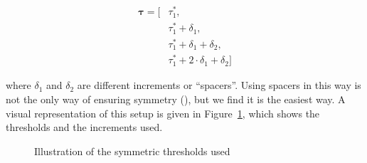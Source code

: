 \documentclass[
]{article}
\begin{document}
\[
\begin{aligned}
\symbf{\tau} = [ & \tau^*_1,  \\
& \tau^*_1 + \delta_1, \\
& \tau^*_1 + \delta_1 + \delta_2, \\
& \tau^*_1 + 2 \cdot \delta_1 + \delta_2 
]
\end{aligned}
\]

where \(\delta_1\) and \(\delta_2\) are different increments or
``spacers''. Using spacers in this way is not the only way of ensuring
symmetry (), but we
find it is the easiest way. A visual representation of this setup is
given in Figure~\ref{fig-thresh}, which shows the thresholds and the
increments used.

\begin{figure}


\caption{\label{fig-thresh}Illustration of the symmetric thresholds
used}

\end{figure}%
\end{document}
